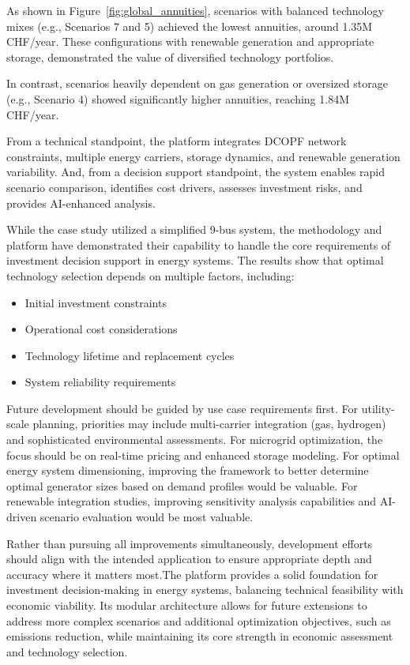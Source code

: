 \begin{itemize}
    As shown in Figure~\ref{fig:global_annuities}, scenarios with balanced technology mixes (e.g., Scenarios 7 
    and 5) achieved the lowest annuities, around 1.35M CHF/year. These configurations with renewable generation 
    and appropriate storage, demonstrated the value of diversified technology portfolios. 
    
    In contrast, scenarios heavily dependent on gas generation or oversized storage (e.g., Scenario 4) showed 
    significantly higher annuities, reaching 1.84M CHF/year.
  \end{itemize} 

From a technical standpoint, the platform integrates DCOPF network constraints, multiple energy 
carriers, storage dynamics, and renewable generation variability. And, from a decision support standpoint, 
the system enables rapid scenario comparison, identifies cost drivers, assesses investment risks, and 
provides AI-enhanced analysis.

While the case study utilized a simplified 9-bus system, the methodology and platform have demonstrated their 
capability to handle the core requirements of investment decision support in energy systems. The results show 
that optimal technology selection depends on multiple factors, including:
\begin{itemize}
    \item Initial investment constraints
    \item Operational cost considerations
    \item Technology lifetime and replacement cycles
    \item System reliability requirements
\end{itemize}

Future development should be guided by use case requirements first. For utility-scale planning, priorities 
may include multi-carrier integration (gas, hydrogen) and sophisticated environmental assessments. For microgrid 
optimization, the focus should be on real-time pricing and enhanced storage modeling. For optimal energy system 
dimensioning, improving the framework to better determine optimal generator sizes based on demand profiles would 
be valuable. For renewable integration studies, improving sensitivity analysis capabilities and AI-driven scenario evaluation 
would be most valuable. 

Rather than pursuing all improvements simultaneously, development efforts should align with the intended 
application to ensure appropriate depth and accuracy where it matters most.The platform provides a solid foundation for investment decision-making in energy systems, balancing technical 
feasibility with economic viability. Its modular architecture allows for future extensions to address more 
complex scenarios and additional optimization objectives, such as emissions reduction, while maintaining its 
core strength in economic assessment and technology selection.

